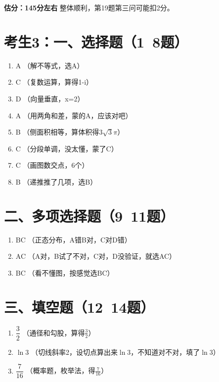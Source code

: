 \documentclass[12pt,a4paper]{article}
\begin{document}
\begin{enumerate}[label=\arabic*.]
\vspace{1cm}
\begin{flushright}
\textbf{估分：145分左右} \quad 整体顺利，第19题第三问可能扣2分。
\end{flushright}

\section*{考生3：一、选择题（1~8题）}
\begin{enumerate}[label=\arabic*.]
\item A \quad （解不等式，选A）
\item C \quad （复数运算，算得1-i）
\item D \quad （向量垂直，x=2）
\item A \quad （用两角和差，蒙的A，应该对吧）
\item B \quad （侧面积相等，算体积得$3\sqrt3\pi$）
\item C \quad （分段单调，没太懂，蒙了C）
\item C \quad （画图数交点，6个）
\item B \quad （递推推了几项，选B）
\end{enumerate}

\section*{二、多项选择题（9~11题）}
\begin{enumerate}[label=\arabic*.]
\item BC \quad （正态分布，A错B对，C对D错）
\item AC \quad （A对，B试了不对，C对，D没验证，就选AC）
\item BC \quad （看不懂图，按感觉选BC）
\end{enumerate}

\section*{三、填空题（12~14题）}
\begin{enumerate}[label=\arabic*.]
\item $\dfrac{3}{2}$ \quad （通径和勾股，算得$\frac32$）
\item $\ln 3$ \quad （切线斜率2，设切点算出来$\ln3$，不知道对不对，填了$\ln3$）
\item $\dfrac{7}{16}$ \quad （概率题，枚举法，得$\frac{7}{16}$）
\end{enumerate}


\end{enumerate}
\end{document}
